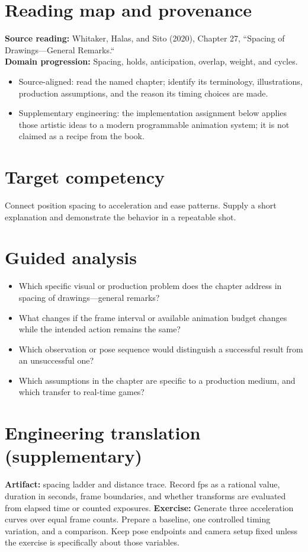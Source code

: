 \documentclass[10pt,letterpaper]{article}
\begin{document}
\makedoctitle
\makedocsummary

\section{Reading map and provenance}
\textbf{Source reading:} Whitaker, Halas, and Sito (2020), Chapter 27, ``Spacing of Drawings—General Remarks.``\\
\textbf{Domain progression:} Spacing, holds, anticipation, overlap, weight, and cycles.
\begin{itemize}
\item Source-aligned: read the named chapter; identify its terminology, illustrations, production assumptions, and the reason its timing choices are made.
\item Supplementary engineering: the implementation assignment below applies those artistic ideas to a modern programmable animation system; it is not claimed as a recipe from the book.
\end{itemize}
\section{Target competency}
Connect position spacing to acceleration and ease patterns. Supply a short explanation and demonstrate the behavior in a repeatable shot.
\section{Guided analysis}
\begin{itemize}
\item Which specific visual or production problem does the chapter address in spacing of drawings—general remarks?
\item What changes if the frame interval or available animation budget changes while the intended action remains the same?
\item Which observation or pose sequence would distinguish a successful result from an unsuccessful one?
\item Which assumptions in the chapter are specific to a production medium, and which transfer to real-time games?
\end{itemize}
\section{Engineering translation (supplementary)}
\textbf{Artifact:} spacing ladder and distance trace. Record fps as a rational value, duration in seconds, frame boundaries, and whether transforms are evaluated from elapsed time or counted exposures.
\textbf{Exercise:} Generate three acceleration curves over equal frame counts. Prepare a baseline, one controlled timing variation, and a comparison. Keep pose endpoints and camera setup fixed unless the exercise is specifically about those variables.
\end{document}
